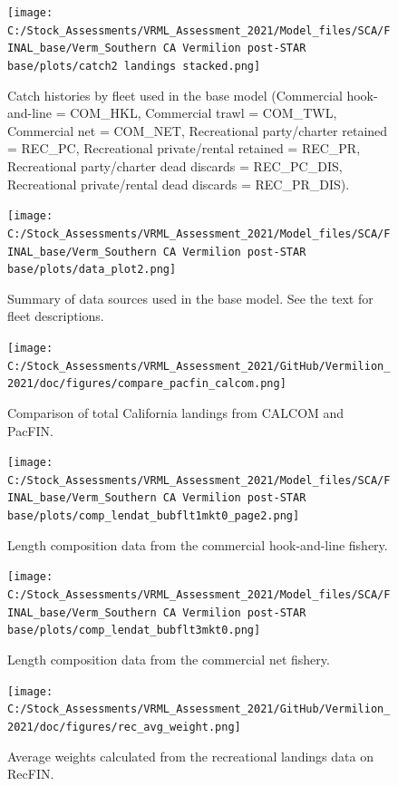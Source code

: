 \documentclass[
  english,
  a4paper,
]{article}
\begin{document}
\begin{figure}
\centering
\texttt{[image: C:/Stock\_Assessments/VRML\_Assessment\_2021/Model\_files/SCA/FINAL\_base/Verm\_Southern CA Vermilion post-STAR base/plots/catch2 landings stacked.png]}
\caption{Catch histories by fleet used in the base model
(Commercial hook-and-line = COM\_HKL,
Commercial trawl = COM\_TWL, Commercial net = COM\_NET,
Recreational party/charter retained = REC\_PC, Recreational
private/rental retained = REC\_PR, Recreational party/charter
dead discards = REC\_PC\_DIS, Recreational private/rental dead
discards = REC\_PR\_DIS).\label{fig:catch}}
\end{figure}

\begin{figure}
\centering
\texttt{[image: C:/Stock\_Assessments/VRML\_Assessment\_2021/Model\_files/SCA/FINAL\_base/Verm\_Southern CA Vermilion post-STAR base/plots/data\_plot2.png]}
\caption{Summary of data sources used in the base model. See the text for fleet descriptions.\label{fig:data-plot}}
\end{figure}

\begin{figure}
\centering
\texttt{[image: C:/Stock\_Assessments/VRML\_Assessment\_2021/GitHub/Vermilion\_2021/doc/figures/compare\_pacfin\_calcom.png]}
\caption{Comparison of total California landings from CALCOM and PacFIN.\label{fig:calcom-pacfin}}
\end{figure}

\FloatBarrier

\FloatBarrier

\begin{figure}
\centering
\texttt{[image: C:/Stock\_Assessments/VRML\_Assessment\_2021/Model\_files/SCA/FINAL\_base/Verm\_Southern CA Vermilion post-STAR base/plots/comp\_lendat\_bubflt1mkt0\_page2.png]}
\caption{Length composition data from the commercial hook-and-line fishery.\label{fig:len-data-COM-HKL}}
\end{figure}

\begin{figure}
\centering
\texttt{[image: C:/Stock\_Assessments/VRML\_Assessment\_2021/Model\_files/SCA/FINAL\_base/Verm\_Southern CA Vermilion post-STAR base/plots/comp\_lendat\_bubflt3mkt0.png]}
\caption{Length composition data from the commercial net fishery.\label{fig:len-data-COM-NET}}
\end{figure}

\begin{figure}
\centering
\texttt{[image: C:/Stock\_Assessments/VRML\_Assessment\_2021/GitHub/Vermilion\_2021/doc/figures/rec\_avg\_weight.png]}
\caption{Average weights calculated from the recreational landings data on RecFIN.\label{fig:rec-avg-weights}}
\end{figure}
\end{document}
